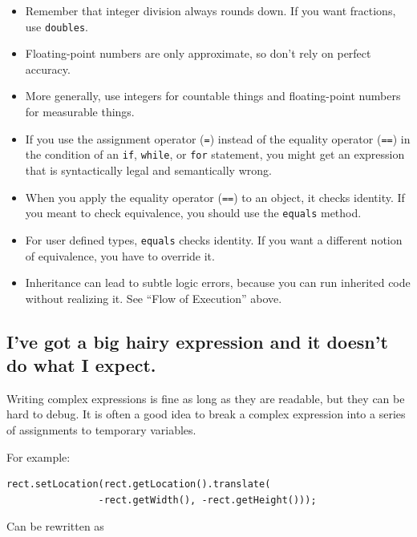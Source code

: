 \documentclass[12pt]{book}
\theoremstyle{exercise}
\begin{document}
\begin{itemize}

\item Remember that integer division always rounds down.  If you
want fractions, use {\tt doubles}.

\item Floating-point numbers are only approximate, so don't rely
on perfect accuracy.

\item More generally, use integers for countable things
and floating-point numbers for measurable things.

\item If you use the assignment operator ({\tt =})
instead of the equality operator ({\tt ==}) in the
condition of an {\tt if}, {\tt while}, or {\tt for} statement,
you might get an expression that is syntactically legal and
semantically wrong.

\item When you apply the equality operator ({\tt ==}) to an
object, it checks identity.  If you meant to check
equivalence, you should use the {\tt equals} method.

\item For user defined types, {\tt equals} checks identity.
If you want a different notion of equivalence, you have to
override it.

\item Inheritance can lead to subtle logic errors,
because you can run inherited code without realizing it.
See ``Flow of Execution'' above.

\end{itemize}


\subsection*{I've got a big hairy expression and it doesn't
do what I expect.}

Writing complex expressions is fine as long as they are readable,
but they can be hard to debug.  It is often a good idea to
break a complex expression into a series of assignments to
temporary variables.

For example:

\begin{lstlisting}
rect.setLocation(rect.getLocation().translate(
                -rect.getWidth(), -rect.getHeight()));
\end{lstlisting}
%
Can be rewritten as
\end{document}
